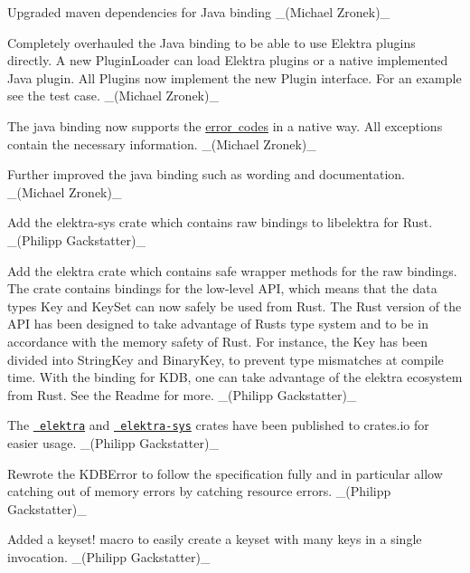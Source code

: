 \begin{DoxyItemize}
\item Upgraded maven dependencies for Java binding \+\_\+(\+Michael Zronek)\+\_\+
\item Completely overhauled the Java binding to be able to use Elektra plugins directly. A new Plugin\+Loader can load Elektra plugins or a native implemented Java plugin. All Plugins now implement the new Plugin interface. For an example see the test case. \+\_\+(\+Michael Zronek)\+\_\+
\item The java binding now supports the \mbox{\hyperlink{doc_decisions_error_codes_md}{error codes}} in a native way. All exceptions contain the necessary information. \+\_\+(\+Michael Zronek)\+\_\+
\item Further improved the java binding such as wording and documentation. \+\_\+(\+Michael Zronek)\+\_\+
\end{DoxyItemize}


\begin{DoxyItemize}
\item Add the {\ttfamily elektra-\/sys} crate which contains raw bindings to libelektra for Rust. \+\_\+(\+Philipp Gackstatter)\+\_\+
\item Add the {\ttfamily elektra} crate which contains safe wrapper methods for the raw bindings. The crate contains bindings for the low-\/level A\+PI, which means that the data types {\ttfamily Key} and {\ttfamily Key\+Set} can now safely be used from Rust. The Rust version of the A\+PI has been designed to take advantage of Rust\textquotesingle{}s type system and to be in accordance with the memory safety of Rust. For instance, the Key has been divided into {\ttfamily String\+Key} and {\ttfamily Binary\+Key}, to prevent type mismatches at compile time. With the binding for {\ttfamily K\+DB}, one can take advantage of the elektra ecosystem from Rust. See the Readme for more. \+\_\+(\+Philipp Gackstatter)\+\_\+
\item The \href{https://crates.io/crates/elektra}{\texttt{ elektra}} and \href{https://crates.io/crates/elektra-sys}{\texttt{ elektra-\/sys}} crates have been published to crates.\+io for easier usage. \+\_\+(\+Philipp Gackstatter)\+\_\+
\item Rewrote the {\ttfamily K\+D\+B\+Error} to follow the specification fully and in particular allow catching out of memory errors by catching resource errors. \+\_\+(\+Philipp Gackstatter)\+\_\+
\item Added a {\ttfamily keyset!} macro to easily create a keyset with many keys in a single invocation. \+\_\+(\+Philipp Gackstatter)\+\_\+
\end{DoxyItemize}


